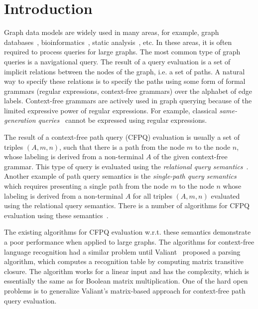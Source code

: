 \section*{Introduction}

Graph data models are widely used in many areas, for example, graph databases~\cite{graphDB}, bioinformatics~\cite{Bio}, static analysis~\cite{zhang2013fast, kodumal2004set}, etc. In these areas, it is often required to process queries for large graphs. The most common type of graph queries is a navigational query. The result of a query evaluation is a set of implicit relations between the nodes of the graph, i.e. a set of paths. A natural way to specify these relations is to specify the paths using some form of formal grammars (regular expressions, context-free grammars) over the alphabet of edge labels. Context-free grammars are actively used in graph querying because of the limited expressive power of regular expressions. For example, classical \emph{same-generation queries}~\cite{FndDB} cannot be expressed using regular expressions.

The result of a context-free path query (CFPQ) evaluation is usually a set of triples \mbox{$(A, m, n)$}, such that there is a path from the node $m$ to the node $n$, whose labeling is derived from a non-terminal $A$ of the given context-free grammar. This type of query is evaluated using the \emph{relational query semantics}~\cite{hellingsRelational}. Another example of path query semantics is the \textit{single-path query semantics}~\cite{hellingsPathQuerying} which requires presenting a single path from the node $m$ to the node $n$ whose labeling is derived from a non-terminal $A$ for all triples $(A, m, n)$ evaluated using the relational query semantics. There is a number of algorithms for CFPQ evaluation using these semantics~\cite{RDF, GLL, hellingsRelational, hellingsPathQuerying, GraphQueryWithEarley}.

The existing algorithms for CFPQ evaluation w.r.t. these semantics demonstrate a poor performance when applied to large graphs. The algorithms for context-free language recognition had a similar problem until Valiant~\cite{valiant} proposed a parsing algorithm, which computes a recognition table by computing matrix transitive closure. The algorithm works for a linear input and has the complexity, which is essentially the same as for Boolean matrix multiplication. One of the hard open problems is to generalize Valiant's matrix-based approach for context-free path query evaluation.

